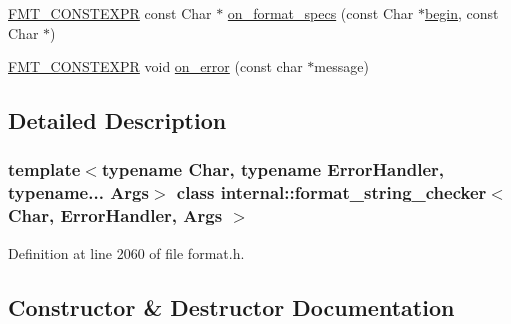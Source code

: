 \begin{DoxyCompactItemize}
\item 
\hyperlink{core_8h_a69201cb276383873487bf68b4ef8b4cd}{F\+M\+T\+\_\+\+C\+O\+N\+S\+T\+E\+X\+PR} const Char $\ast$ \hyperlink{classinternal_1_1format__string__checker_ab58cc5258709ff65992f15b42eb53259}{on\+\_\+format\+\_\+specs} (const Char $\ast$\hyperlink{namespaceinternal_a265f36d9dee68d3f44381347ef2fd5cb}{begin}, const Char $\ast$)
\item 
\hyperlink{core_8h_a69201cb276383873487bf68b4ef8b4cd}{F\+M\+T\+\_\+\+C\+O\+N\+S\+T\+E\+X\+PR} void \hyperlink{classinternal_1_1format__string__checker_a4436018134529c7b630b05bef2342b89}{on\+\_\+error} (const char $\ast$message)
\end{DoxyCompactItemize}


\subsection{Detailed Description}
\subsubsection*{template$<$typename Char, typename Error\+Handler, typename... Args$>$\newline
class internal\+::format\+\_\+string\+\_\+checker$<$ Char, Error\+Handler, Args $>$}



Definition at line 2060 of file format.\+h.



\subsection{Constructor \& Destructor Documentation}
\mbox{\label{classinternal_1_1format__string__checker_ace9b5d14d17800788cb39fcfe900712d}} 
